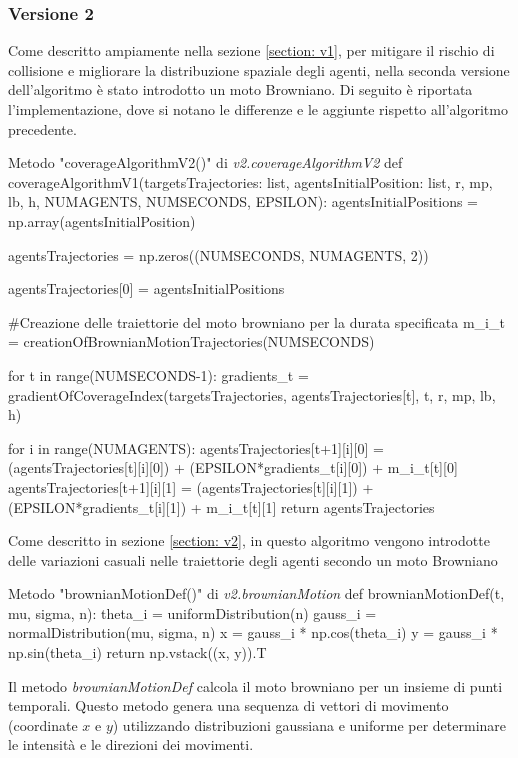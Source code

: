 \documentclass[twoside]{article}
\begin{document}
\subsubsection{Versione 2}
Come descritto ampiamente nella sezione \ref{section: v1}, per mitigare il rischio di collisione e migliorare la distribuzione spaziale degli agenti, nella seconda versione dell'algoritmo è stato introdotto un moto Browniano. Di seguito è riportata l'implementazione, dove si notano le differenze e le aggiunte rispetto all'algoritmo precedente.

\clearpage

\begin{code}{Metodo "coverageAlgorithmV2()" di \textit{v2.coverageAlgorithmV2}}
def coverageAlgorithmV1(targetsTrajectories: list, agentsInitialPosition: list, r, mp, lb, h, NUMAGENTS, NUMSECONDS, EPSILON):
    agentsInitialPositions = np.array(agentsInitialPosition)
    
    agentsTrajectories = np.zeros((NUMSECONDS, NUMAGENTS, 2))  
    
    agentsTrajectories[0] = agentsInitialPositions

    #Creazione delle traiettorie del moto browniano per la durata specificata
    m_i_t = creationOfBrownianMotionTrajectories(NUMSECONDS)
    
    for t in range(NUMSECONDS-1): 
        gradients_t = gradientOfCoverageIndex(targetsTrajectories, agentsTrajectories[t], t, r, mp, lb, h)
        
        for i in range(NUMAGENTS):
            agentsTrajectories[t+1][i][0] = (agentsTrajectories[t][i][0]) + (EPSILON*gradients_t[i][0]) + m_i_t[t][0]
            agentsTrajectories[t+1][i][1] = (agentsTrajectories[t][i][1]) + (EPSILON*gradients_t[i][1]) + m_i_t[t][1]
    return agentsTrajectories
\end{code}

Come descritto in sezione \ref{section: v2}, in questo algoritmo vengono introdotte delle variazioni casuali nelle traiettorie degli agenti secondo un moto Browniano

\begin{code}{Metodo "brownianMotionDef()" di \textit{v2.brownianMotion}}
def brownianMotionDef(t, mu, sigma, n):
    theta_i = uniformDistribution(n)
    gauss_i = normalDistribution(mu, sigma, n)
    x = gauss_i * np.cos(theta_i)
    y = gauss_i * np.sin(theta_i)
    return np.vstack((x, y)).T
\end{code}

Il metodo \textit{brownianMotionDef} calcola il moto browniano per un insieme di punti temporali. Questo metodo genera una sequenza di vettori di movimento (coordinate $x$ e $y$) utilizzando distribuzioni gaussiana e uniforme per determinare le intensità e le direzioni dei movimenti.
\end{document}
